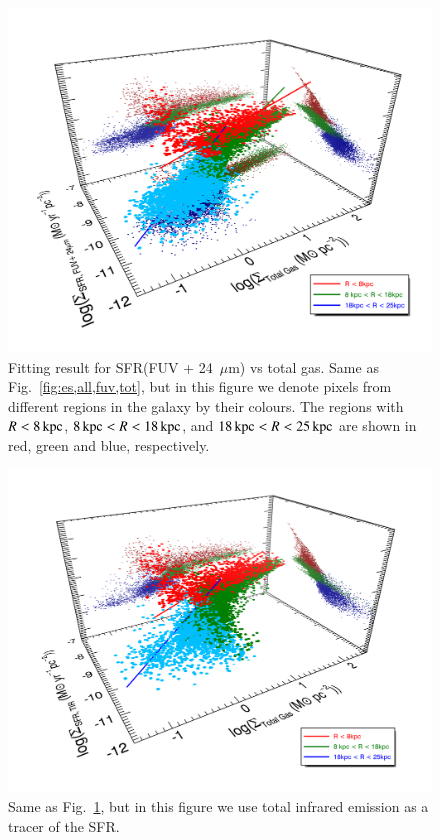 \begin{figure}
\centering
\includegraphics[width=\textwidth]{../image_paper1/color_3d_fuv_tot.png}
\caption[Result from fitting the extended Schmidt law in three regions in M31]{Fitting result for SFR(FUV + 24~$\mu$m) vs total gas. Same as Fig.~\ref{fig:es,all,fuv,tot}, but in this figure we denote pixels from different regions in the galaxy by their colours. The regions with $R< 8\,{\rm kpc}$, $8\,{\rm kpc} < R < 18\,{\rm kpc}$, and $18\,{\rm kpc} < R < 25\,{\rm kpc}$ are shown in red, green and blue, respectively.}
\label{fig:es,regs,fuv,tot}
\end{figure}

\begin{figure}
\centering
\includegraphics[width=\textwidth]{../image_paper1/color_3d_tir_tot.png}
\caption{Same as Fig.~\ref{fig:es,regs,fuv,tot}, but in this figure we use total infrared emission as a tracer of the SFR.}
\label{fig:es,regs,fir,tot}
\end{figure}


